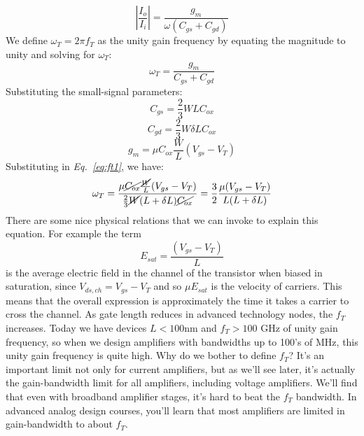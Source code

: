     \begin{equation} 
        \left| {\frac{{{I_o}}}{{{I_i}}}} \right| = \frac{{{g_m}}}{{\omega ({C_{gs}} + {C_{gd}})}} 
    \end{equation}
We define $\omega_T = 2\pi f_T$ as the unity gain frequency by equating the magnitude to unity and solving for $\omega_T$:
    \begin{equation} 
        {\omega _T} = \frac{{{g_m}}}{{{C_{gs}} + {C_{gd}}}}   \label{eq:ft1}
    \end{equation}
Substituting the small-signal parameters:
    \begin{equation}
        C_{gs} = \frac{2}{3} W L C_{ox}
    \end{equation}
    \begin{equation}
        C_{gd} = \frac{2}{3} W \delta L C_{ox}
    \end{equation}
    \begin{equation}
        g_m = \mu C_{ox} \frac{W}{L} (V_{gs} - V_T)
    \end{equation}
Substituting in \emph{Eq.~\ref{eq:ft1}}, we have:
    \begin{equation} 
        {\omega _T} = \frac{\mu \cancel{C_{ox}} \frac{\cancel{W}}{L} (V_{gs} - V_T)}{\frac{2}{3} \cancel{W} (L + \delta L) \cancel{C_{ox}}} = \frac{3}{2} \frac{\mu (V_{gs} - V_T)}{L(L+\delta L)}  \label{eq:ft2}
    \end{equation}
There are some nice physical relations that we can invoke to explain this equation.  For example the term
    \begin{equation}
        E_{sat} = \frac{(V_{gs} - V_T)}{L}
    \end{equation}
is the average electric field in the channel of the transistor when biased in saturation, since $V_{ds,ch} = V_{gs} - V_T$ and so $\mu E_{sat}$ is the velocity of carriers.  This means that the overall expression is approximately the time it takes a carrier to cross the channel.  
As gate length reduces in advanced technology nodes, the $f_T$ increases.  Today we have devices $L < 100$nm and $f_T > 100$ GHz of unity gain frequency, so when we design amplifiers with bandwidths up to 100's of MHz, this unity gain frequency is quite high.
Why do we bother to define $f_T$?  It's an important limit not only for current amplifiers, but as we'll see later, it's actually the gain-bandwidth limit for all amplifiers, including voltage amplifiers.  We'll find that even with broadband amplifier stages, it's hard to beat the $f_T$ bandwidth.  In advanced analog design courses, you'll learn that  most amplifiers are limited in gain-bandwidth to about $f_T$. 
